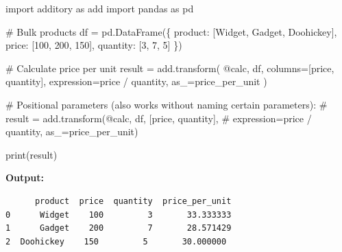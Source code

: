 \documentclass[
  letterpaper,
]{scrbook}
\newenvironment{Shaded}{\begin{snugshade}}{\end{snugshade}}
\newcommand{\BuiltInTok}[1]{\textcolor[rgb]{0.00,0.23,0.31}{#1}}
\newcommand{\CommentTok}[1]{\textcolor[rgb]{0.37,0.37,0.37}{#1}}
\newcommand{\DecValTok}[1]{\textcolor[rgb]{0.68,0.00,0.00}{#1}}
\newcommand{\ImportTok}[1]{\textcolor[rgb]{0.00,0.46,0.62}{#1}}
\newcommand{\NormalTok}[1]{\textcolor[rgb]{0.00,0.23,0.31}{#1}}
\newcommand{\OperatorTok}[1]{\textcolor[rgb]{0.37,0.37,0.37}{#1}}
\newcommand{\StringTok}[1]{\textcolor[rgb]{0.13,0.47,0.30}{#1}}
\begin{document}
\begin{Shaded}
\begin{Highlighting}[]
\ImportTok{import}\NormalTok{ additory }\ImportTok{as}\NormalTok{ add}
\ImportTok{import}\NormalTok{ pandas }\ImportTok{as}\NormalTok{ pd}

\CommentTok{\# Bulk products}
\NormalTok{df }\OperatorTok{=}\NormalTok{ pd.DataFrame(\{}
    \StringTok{\textquotesingle{}product\textquotesingle{}}\NormalTok{: [}\StringTok{\textquotesingle{}Widget\textquotesingle{}}\NormalTok{, }\StringTok{\textquotesingle{}Gadget\textquotesingle{}}\NormalTok{, }\StringTok{\textquotesingle{}Doohickey\textquotesingle{}}\NormalTok{],}
    \StringTok{\textquotesingle{}price\textquotesingle{}}\NormalTok{: [}\DecValTok{100}\NormalTok{, }\DecValTok{200}\NormalTok{, }\DecValTok{150}\NormalTok{],}
    \StringTok{\textquotesingle{}quantity\textquotesingle{}}\NormalTok{: [}\DecValTok{3}\NormalTok{, }\DecValTok{7}\NormalTok{, }\DecValTok{5}\NormalTok{]}
\NormalTok{\})}

\CommentTok{\# Calculate price per unit}
\NormalTok{result }\OperatorTok{=}\NormalTok{ add.transform(}
    \StringTok{\textquotesingle{}@calc\textquotesingle{}}\NormalTok{,}
\NormalTok{    df,}
\NormalTok{    columns}\OperatorTok{=}\NormalTok{[}\StringTok{\textquotesingle{}price\textquotesingle{}}\NormalTok{, }\StringTok{\textquotesingle{}quantity\textquotesingle{}}\NormalTok{],}
\NormalTok{    expression}\OperatorTok{=}\StringTok{\textquotesingle{}price / quantity\textquotesingle{}}\NormalTok{,}
\NormalTok{    as\_}\OperatorTok{=}\StringTok{\textquotesingle{}price\_per\_unit\textquotesingle{}}
\NormalTok{)}

\CommentTok{\# Positional parameters (also works without naming certain parameters):}
\CommentTok{\# result = add.transform(\textquotesingle{}@calc\textquotesingle{}, df, [\textquotesingle{}price\textquotesingle{}, \textquotesingle{}quantity\textquotesingle{}], }
\CommentTok{\#                        expression=\textquotesingle{}price / quantity\textquotesingle{}, as\_=\textquotesingle{}price\_per\_unit\textquotesingle{})}

\BuiltInTok{print}\NormalTok{(result)}
\end{Highlighting}
\end{Shaded}

\textbf{Output:}

\begin{verbatim}
      product  price  quantity  price_per_unit
0      Widget    100         3       33.333333
1      Gadget    200         7       28.571429
2  Doohickey    150         5       30.000000
\end{verbatim}
\end{document}
